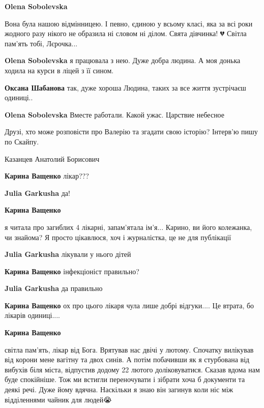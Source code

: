 \begin{multicols}{2}
\begin{itemize}
\begin{itemize} %
\textbf{Olena Sobolevska} 

Вона була нашою відмінницею. І певно, єдиною у всьому класі, яка за всі роки
жодного разу нікого не образила ні словом ні ділом. Свята дівчинка! 💔 Світла
пам'ять тобі, Лєрочка...

\textbf{Olena Sobolevska} я працювала з нею. Дуже добра людина. А моя донька ходила на курси в ліцей з її сином.

\textbf{Оксана Шабанова} так, дуже хороша Людина, таких за все життя зустрічаєш одиниці..

\textbf{Olena Sobolevska} Вместе работали. Какой ужас. Царствие небесное

Друзі, хто може розповісти про Валерію та згадати свою історію? Інтерв'ю пишу по Скайпу.
\end{itemize} %


Казанцев Анатолий Борисович

\begin{itemize} %
\textbf{Карина Ващенко} лікар???

\textbf{Julia Garkusha} да!

\textbf{Карина Ващенко} 

я читала про загиблих 4 лікарні, запам'ятала ім'я... Карино, ви його колежанка,
чи знайома? Я просто цікавлюся, хоч і журналістка, це не для публікації

\textbf{Julia Garkusha} лікували у нього дітей

\textbf{Карина Ващенко} інфекціоніст правильно?

\textbf{Julia Garkusha} да правильно

\textbf{Карина Ващенко} ох про цього лікаря чула лише добрі відгуки.... Це втрата, бо лікарів одиниці....

\textbf{Карина Ващенко} 

світла пам'ять, лікар від Бога. Врятував нас двічі у лютому. Спочатку вилікував
від корони мене вагітну та двох синів. А потім побачивши як я стурбована від
вибухів біля міста, відпустив додому 22 лютого доліковуватися. Сказав вдома нам
буде спокійніше. Тож ми встигли переночувати і зібрати хоча б документи та
деякі речі. Дуже йому вдячна. Наскільки я знаю він загинув коли ніс між
відділеннями чайник для людей😭


\end{itemize}
\end{itemize}
\end{multicols}
